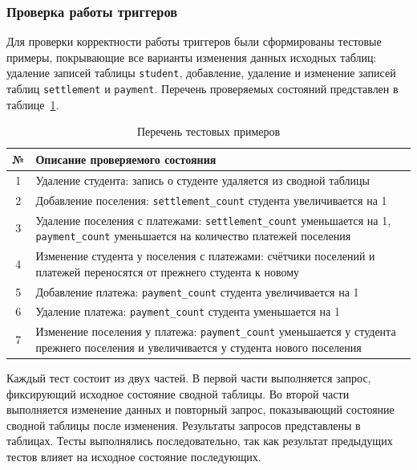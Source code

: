 \subsubsection{Проверка работы триггеров}

Для проверки корректности работы триггеров были сформированы тестовые примеры, покрывающие все варианты изменения данных исходных таблиц: удаление записей таблицы \texttt{student}, добавление, удаление и изменение записей таблиц \texttt{settlement} и \texttt{payment}. Перечень проверяемых состояний представлен в таблице~\ref{tab:trigger_tests}.

\begin{table}[H]
\centering
\caption{Перечень тестовых примеров}
\label{tab:trigger_tests}
\begin{tabularx}{\textwidth}{|c|X|}
\hline
\textbf{№} & \textbf{Описание проверяемого состояния} \\ \hline
1 & Удаление студента: запись о студенте удаляется из сводной таблицы \\ \hline
2 & Добавление поселения: \texttt{settlement\_count} студента увеличивается на 1 \\ \hline
3 & Удаление поселения с платежами: \texttt{settlement\_count} уменьшается на 1, \texttt{payment\_count} уменьшается на количество платежей поселения \\ \hline
4 & Изменение студента у поселения с платежами: счётчики поселений и платежей переносятся от прежнего студента к новому \\ \hline
5 & Добавление платежа: \texttt{payment\_count} студента увеличивается на 1 \\ \hline
6 & Удаление платежа: \texttt{payment\_count} студента уменьшается на 1 \\ \hline
7 & Изменение поселения у платежа: \texttt{payment\_count} уменьшается у студента прежнего поселения и увеличивается у студента нового поселения \\ \hline
\end{tabularx}
\end{table}

Каждый тест состоит из двух частей. В первой части выполняется запрос, фиксирующий исходное состояние сводной таблицы. Во второй части выполняется изменение данных и повторный запрос, показывающий состояние сводной таблицы после изменения. Результаты запросов представлены в таблицах. Тесты выполнялись последовательно, так как результат предыдущих тестов влияет на исходное состояние последующих.

